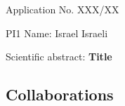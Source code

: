 \documentclass[10pt,a4paper]{article}
\begin{document}
Application No. XXX/XX

PI1 Name: Israel Israeli 

Scientific abstract: \textbf{Title}

\bigskip

\subsection*{Collaborations}
\end{document}
